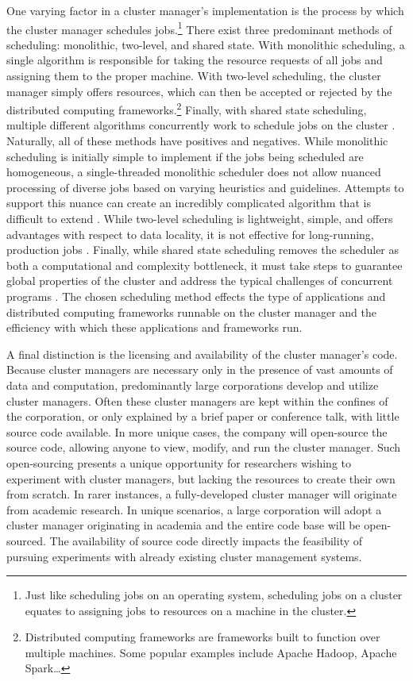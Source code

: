 One varying factor in a cluster manager's implementation is the process
by which the cluster manager schedules jobs.\footnote{Just like scheduling jobs
on an operating system, scheduling jobs on
a cluster equates to assigning jobs to resources on a machine in the cluster.}
There exist three predominant methods of scheduling: monolithic, two-level, and
shared state. With monolithic scheduling, a single algorithm
is responsible for taking the resource requests of all jobs and assigning them
to the proper machine. With two-level scheduling, the cluster manager simply
offers resources, which can then be accepted or rejected by the distributed
computing frameworks.\footnote{Distributed computing frameworks are frameworks
built to function over multiple machines. Some popular examples include
Apache Hadoop, Apache Spark\dots \cite{mesos}}
Finally, with shared state scheduling, multiple different algorithms concurrently work to
schedule jobs on the cluster \cite{omega}. Naturally, all
of these methods have positives and negatives. While monolithic scheduling is
initially simple to implement if the jobs being scheduled are homogeneous,
a single-threaded monolithic scheduler does not allow
nuanced processing of diverse jobs based on varying heuristics and guidelines.
Attempts to support this nuance can create an incredibly
complicated algorithm that is difficult to extend \cite{omega}.
While two-level scheduling is lightweight, simple, and offers advantages with respect to
data locality, it is not effective for long-running,
production jobs \cite{omega}.
Finally, while shared state scheduling removes the scheduler as
both a computational and complexity bottleneck, it must take steps to guarantee
global properties of the cluster and address the typical challenges of
concurrent programs \cite{omega}.
The chosen scheduling method
effects the type of applications and distributed computing frameworks
runnable on the cluster manager and the efficiency with which these applications
and frameworks run.

A final distinction is the licensing and availability of the cluster manager's code.
Because cluster managers are necessary only in the presence of vast amounts of
data and computation, predominantly large
corporations develop and utilize cluster managers. Often these cluster
managers are kept within the confines of the corporation, or only explained by a
brief paper or conference talk, with little source code available. In more
unique cases, the company will open-source the source code, allowing anyone to
view, modify, and run the cluster manager. Such open-sourcing presents a unique opportunity
for researchers wishing to experiment with cluster managers, but lacking the
resources to create their own from scratch. In rarer instances, a
fully-developed cluster manager will originate from academic research. In unique
scenarios, a large corporation will adopt a cluster manager originating in
academia and the entire code base will
be open-sourced. The availability of source code directly impacts the
feasibility of pursuing experiments with already existing cluster management
systems.

